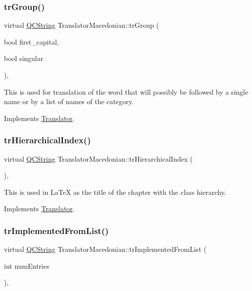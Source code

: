 \subsubsection{\texorpdfstring{trGroup()}{trGroup()}}
{\footnotesize\ttfamily virtual \mbox{\hyperlink{class_q_c_string}{Q\+C\+String}} Translator\+Macedonian\+::tr\+Group (\begin{DoxyParamCaption}\item[{bool}]{first\+\_\+capital,  }\item[{bool}]{singular }\end{DoxyParamCaption})\hspace{0.3cm}{\ttfamily [inline]}, {\ttfamily [virtual]}}

This is used for translation of the word that will possibly be followed by a single name or by a list of names of the category. 

Implements \mbox{\hyperlink{class_translator}{Translator}}.

\mbox{\label{class_translator_macedonian_a70cb97d54a5ebb60adc9a3cd8b4b5229}} 
\subsubsection{\texorpdfstring{trHierarchicalIndex()}{trHierarchicalIndex()}}
{\footnotesize\ttfamily virtual \mbox{\hyperlink{class_q_c_string}{Q\+C\+String}} Translator\+Macedonian\+::tr\+Hierarchical\+Index (\begin{DoxyParamCaption}{ }\end{DoxyParamCaption})\hspace{0.3cm}{\ttfamily [inline]}, {\ttfamily [virtual]}}

This is used in La\+TeX as the title of the chapter with the class hierarchy. 

Implements \mbox{\hyperlink{class_translator}{Translator}}.

\mbox{\label{class_translator_macedonian_a51a94cc990d3e8c730ed42a701548db9}} 
\subsubsection{\texorpdfstring{trImplementedFromList()}{trImplementedFromList()}}
{\footnotesize\ttfamily virtual \mbox{\hyperlink{class_q_c_string}{Q\+C\+String}} Translator\+Macedonian\+::tr\+Implemented\+From\+List (\begin{DoxyParamCaption}\item[{int}]{num\+Entries }\end{DoxyParamCaption})\hspace{0.3cm}{\ttfamily [inline]}, {\ttfamily [virtual]}}

